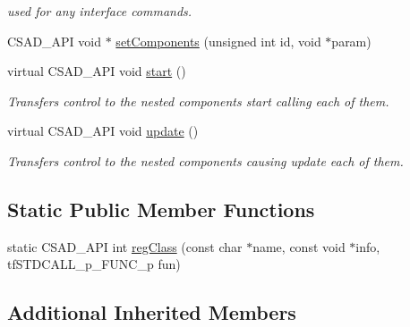 \begin{DoxyCompactItemize}
\begin{DoxyCompactList}\small\item\em used for any interface commands. \end{DoxyCompactList}\item 
C\-S\-A\-D\-\_\-\-A\-P\-I void $\ast$ \hyperlink{classcsad_1_1_container_components_a3c373a98a6981e002151a7cd1e1c89c8}{set\-Components} (unsigned int id, void $\ast$param)
\item 
\hypertarget{classcsad_1_1_container_components_a63b01a1010a04844579bb9d011283e05}{virtual C\-S\-A\-D\-\_\-\-A\-P\-I void \hyperlink{classcsad_1_1_container_components_a63b01a1010a04844579bb9d011283e05}{start} ()}\label{classcsad_1_1_container_components_a63b01a1010a04844579bb9d011283e05}

\begin{DoxyCompactList}\small\item\em Transfers control to the nested components start calling each of them. \end{DoxyCompactList}\item 
\hypertarget{classcsad_1_1_container_components_a5ea5732bcd86cdb9c745cb323ee9c4af}{virtual C\-S\-A\-D\-\_\-\-A\-P\-I void \hyperlink{classcsad_1_1_container_components_a5ea5732bcd86cdb9c745cb323ee9c4af}{update} ()}\label{classcsad_1_1_container_components_a5ea5732bcd86cdb9c745cb323ee9c4af}

\begin{DoxyCompactList}\small\item\em Transfers control to the nested components causing update each of them. \end{DoxyCompactList}\end{DoxyCompactItemize}
\subsection*{Static Public Member Functions}
\begin{DoxyCompactItemize}
\item 
static C\-S\-A\-D\-\_\-\-A\-P\-I int \hyperlink{classcsad_1_1_container_components_ac09864fc54d500377e5df6b095f5f2c7}{reg\-Class} (const char $\ast$name, const void $\ast$info, tf\-S\-T\-D\-C\-A\-L\-L\-\_\-p\-\_\-\-F\-U\-N\-C\-\_\-p fun)
\end{DoxyCompactItemize}
\subsection*{Additional Inherited Members}


